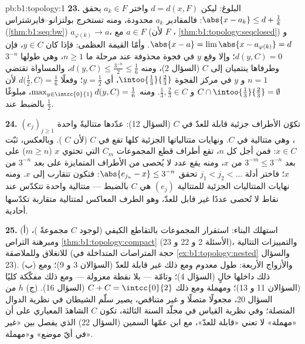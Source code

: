 \begin{solution}{pb:b1:topology:1}
\textbf{23.} البلوغ: ليكن $d = d(x, F)$ واختر $a_k \in F$
يحقق $\abs{x - a_k} \leq d + \frac1k$: فالمقادير $a_k$ محدودة، ومنه
تستخرج بولتزانو--فايرشتراس (\cref{thm:b1:seq:bw})
$a_{\varphi(k)} \to a$، مع $a \in F$ (لأن $F$ ،
\cref{thm:b1:topology:seqclosed}) و $\abs{x - a} = \lim
\abs{x - a_{\varphi(k)}} = d$. وأمّا القيمة العظمى: فإذا كان $y \in C$،
فإن $d(y, C) = 0$؛ وإلا وقع $y$ في فجوة محذوفة عند مرحلة ما
$n \geq 1$، وهي   طولها $3^{-n}$ وطرفاها
ينتميان إلى $C$ (السؤال 2)، ومنه $d(y, C) \leq
\frac{3^{-n}}{2} \leq \frac16$، والمساواة تقتضي $n = 1$
و $y$ في مركز الفجوة $\intoo{\frac13}{\frac23}$،
أي $y = \frac12$؛ وفعلًا $d\bigl(\frac12, C\bigr) =
\frac16$ لأن $C \cap \intoo{\frac13}{\frac23} = \emptyset$ و
$\frac13, \frac23 \in C$. ومنه $\max_{y\in\intcc{0}{1}} d(y, C)
= \frac16$، مبلوغًا بالضبط عند $\frac12$.

\textbf{24.} تكوّن الأطراف  جزئية قابلة للعدّ  في $C$
(السؤال 12): عدّدها متتاليةً واحدة $(e_j)_{j\geq1}$،
وهي متتالية في $C$. ونهايات متتالياتها الجزئية كلها تقع في $C$ (لأن $C$
). وبالعكس، ثبّت $x \in C$: فمن أجل كل $n$، تقع أطراف قطع
المجموعات $C_m$ التي تحتوي $x$ ($m \geq n$) على بعد
$3^{-m} \leq 3^{-n}$ من $x$، ومنه يقع عدد لا يُحصى من الأطراف
المتمايزة على بعد $3^{-n}$ من $x$؛ فاختر أدلة $j_1 < j_2
< \dots$ تحقق $\abs{e_{j_n} - x} \leq 3^{-n}$: فتكون 
تتقارب إلى $x$. ومنه  نهايات المتتاليات الجزئية للمتتالية $(e_j)$
هي $C$ بالضبط --- متتالية واحدة تتكدّس عند نقاط لا تُحصى
عددًا غير قابل للعدّ، وهو الطرف المعاكس لمتتالية متقاربة
 تكدّسها أحادية.

\textbf{25.} (أ) استهلك البناء: استقرار المجموعات
 بالتقاطع الكيفي (لوجود $C$ مجموعةً
)، ومبرهنة التراص \cref{thm:b1:topology:compact}
(الأسئلة 2 و 22 و 23)، والتمييزات التتالية
للانغلاق وللملاصقة (حجة المتراصات المتداخلة في
\cref{ex:b1:topology:nested} والسؤال 23). (ب) والأزواج
الأربعة: طول معدوم ومع ذلك غير قابلة للعدّ (السؤالان 3 و 9)؛ 
ومع ذلك داخلها خالٍ (السؤال 4)؛ وتامّة --- بلا نقطة
معزولة --- ومع ذلك مفكّكة كليًا (السؤالان 11 و 13)؛
ومهملة ومع ذلك $C + C = \intcc{0}{2}$ (السؤال 16). (ج)
 $h$ من السؤال 20، مجعولًا متصلًا و
غير متناقص، يصير سلّم الشيطان في نظرية
الدوال المتصلة؛ وفي نظرية القياس في مجلّد السنة الثالثة،
تكون $C$ الشاهدَ المعياري على أن «مهملة» لا تعني
«قابلة للعدّ»، مع ابن عمّها السمين (السؤال 22) الذي يفصل
بين «غير  في أيّ موضع» و«مهملة».
\end{solution}
